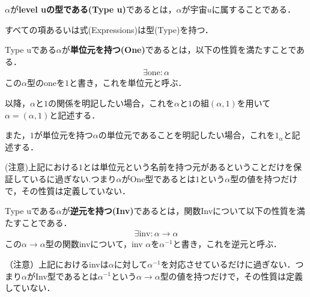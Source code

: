 %




%


\begin{definition}
    $\alpha$が\textbf{level uの型である(Type u)}であるとは，$\alpha$が宇宙$u$に属することである．

    すべての項あるいは式(Expressions)は型(Type)を持つ．

\end{definition}


\begin{definition}
    Type uである$\alpha$が\textbf{単位元を持つ(One)}であるとは，以下の性質を満たすことである．
    \begin{align}
        \exists\text{one} : \alpha
    \end{align}
    この$\alpha$型のoneを$1$と書き，これを単位元と呼ぶ．

    以降，$\alpha$と$1$の関係を明記したい場合，これを$\alpha$と$1$の組$(\alpha,1)$を用いて$\alpha = (\alpha,1)$と記述する．

    また，$1$が単位元を持つ$\alpha$の単位元であることを明記したい場合，これを$1_\alpha$と記述する．

    (注意)上記における$1$とは単位元という名前を持つ元があるということだけを保証しているに過ぎない.つまり$\alpha$がOne型であるとは$1$という$\alpha$型の値を持つだけで，その性質は定義していない．
\end{definition}

\begin{definition}
    Type uである$\alpha$が\textbf{逆元を持つ(Inv)}であるとは，関数Invについて以下の性質を満たすことである．
    \begin{align}
        \exists\text{inv} : \alpha \rightarrow \alpha
    \end{align}
    この$\alpha \rightarrow \alpha$型の関数invについて，inv $\alpha$を$\alpha^{-1}$と書き，これを逆元と呼ぶ．

    （注意）上記におけるinvは$\alpha$に対して$\alpha^{-1}$を対応させているだけに過ぎない．つまり$\alpha$がInv型であるとは$\alpha^{-1}$という$\alpha\rightarrow\alpha$型の値を持つだけで，その性質は定義していない．
\end{definition}

